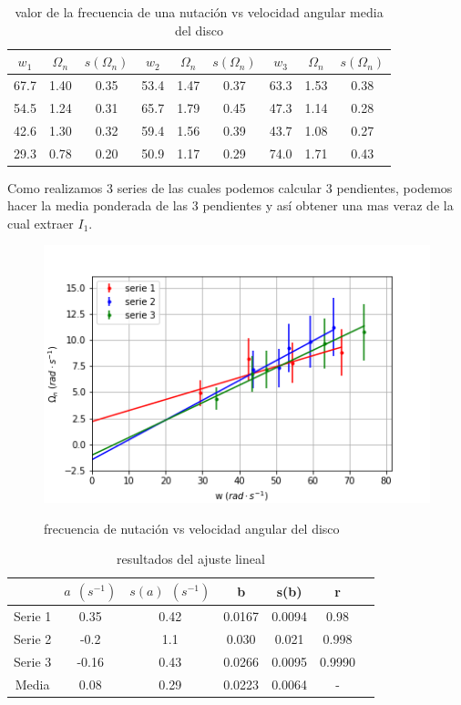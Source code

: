 \documentclass[12pt,a4paper]{article}
\begin{document}
\begin{table}[h!] \centering 
\begin{tabular}{|c|c|c||c|c|c||c|c|c|}
\hline $ w_1 $ 	 & $ \Omega_n $ 	 & $s(\Omega_n)$ 	 & $w_2$ 	 & $\Omega_n$ 	 & $s(\Omega_n)$ 	 & $w_3$ 	 & $\Omega_n$ 	 &  $s(\Omega_n)$ \\ \hline 
 67.7 	 & 1.40 	 & 0.35 	 & 53.4 	 & 1.47 	 & 0.37 	 & 63.3 	 & 1.53 	 & 0.38  \\ 
 54.5 	 & 1.24	 & 0.31 	 & 65.7 	 & 1.79	 & 0.45	 & 47.3 	 & 1.14 	 & 0.28  \\ 
 42.6 	 & 1.30 	 & 0.32	 & 59.4 	 & 1.56 	 & 0.39 	 & 43.7 	 & 1.08	 & 0.27  \\ 
 29.3 	 & 0.78 	 & 0.20 	 & 50.9 	 & 1.17	 & 0.29 	 & 74.0 	 & 1.71 	 & 0.43  \\  \hline  \end{tabular}
\caption{valor de la frecuencia de una nutación vs velocidad angular media del disco} 
\end{table}


Como realizamos 3 series de las cuales podemos calcular 3 pendientes, podemos hacer la media ponderada de las 3 pendientes y así obtener una mas veraz de la cual extraer $I_1$.

\newpage

\begin{figure}[h!] \centering
\includegraphics[scale=1]{regresionlineal-nutacion.png}
\label{fig:third}
\caption{frecuencia de nutación vs velocidad angular del disco}
\end{figure}

\begin{table}[h!] \centering 
\begin{tabular}{|c|c|c|c|c||c|c|} 
\hline  	 & $ a \ \ (s^{-1})$ 	 & $s(a) \ \  (s^{-1})$ 	 & b 	 & s(b) 	 & r 	       \\ \hline
Serie 1  & 0.35 	 & 0.42 	 & 0.0167 	 & 0.0094 	 & 0.98	  \\ 
Serie 2 	 & -0.2 	 & 1.1 	 & 0.030	 & 0.021 	 & 0.998	  \\ 
Serie 3 	 & -0.16 	 & 0.43 	 & 0.0266	 & 0.0095 	 & 0.9990 	  \\ 
Media   	 & 0.08	 & 0.29	 & 0.0223 	 & 0.0064 	 & - 	  \\ 
\hline 
 \end{tabular} 
\caption{resultados del ajuste lineal} 
\end{table} 
\end{document}
